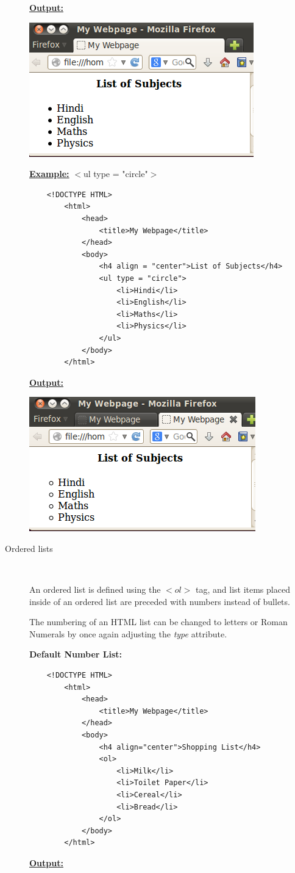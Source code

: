 \documentclass[11pt,a4paper]{article}
\begin{document}
\begin{description}
\underline{\textbf{Output:}}

\includegraphics[scale=0.6]{Disc.png}\

\underline{\textbf{Example:}} $<$ul type = "circle"$>$
\begin{verbatim}
    <!DOCTYPE HTML>
        <html>
            <head>
                <title>My Webpage</title>
            </head>
            <body>
                <h4 align = "center">List of Subjects</h4>
                <ul type = "circle">
                    <li>Hindi</li>
                    <li>English</li>
                    <li>Maths</li>
                    <li>Physics</li>
                </ul>
            </body>
        </html>
\end{verbatim}

\underline{\textbf{Output:}}\

\includegraphics[scale=0.7]{circle.png}\

\item[Ordered lists]\

An ordered list is defined using the $<ol>$ tag, and list items placed inside of an ordered list are preceded with numbers instead of bullets.

The numbering of an HTML list can be changed to letters or Roman Numerals by once again adjusting the \emph{type} attribute.\

\textbf{Default Number List:}
\begin{verbatim}
    <!DOCTYPE HTML>
        <html>
            <head>
                <title>My Webpage</title>
            </head>
            <body>
                <h4 align="center">Shopping List</h4>
                <ol>
                    <li>Milk</li>
                    <li>Toilet Paper</li>
                    <li>Cereal</li>
                    <li>Bread</li>
                </ol>
            </body>
        </html>
\end{verbatim}
\underline{\textbf{Output:}}\\


\end{description}
\end{document}
